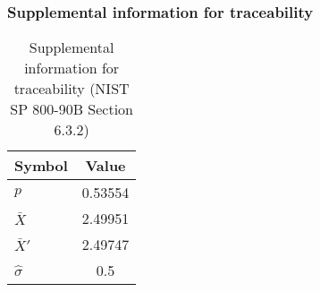 \documentclass[a3paper,xelatex,english]{bxjsarticle}
\begin{document}
\subsubsection{Supplemental information for traceability}
\renewcommand{\arraystretch}{1.8}
\begin{table}[h]
\caption{Supplemental information for traceability (NIST SP 800-90B Section 6.3.2)}
\begin{center}
\begin{tabular}{|l|c|}
\hline 
\rowcolor{anotherlightblue} %
Symbol				& Value \\ \hline 
$p$				&  0.53554\\ \hline 
$\bar{X}$ 		&  2.49951\\ \hline
$\bar{X}'$		&  2.49747\\ \hline
$\hat{\sigma}$		&      0.5\\ \hline
\end{tabular}
\end{center}
\end{table}
\renewcommand{\arraystretch}{1.4}
\clearpage
\end{document}
